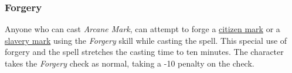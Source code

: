 \subsubsection{Forgery}

Anyone who can cast \emph{Arcane Mark}, can attempt to forge a
\hyperref[sec:Citizen Marks]{citizen mark} or a
\hyperref[sec:Slavery Marks]{slavery mark} using the \emph{Forgery}
skill while casting the spell. This special use of forgery and
the spell stretches the casting time to ten minutes. The character
takes the \emph{Forgery} check as normal, taking a -10 penalty on
the check.

\FloatBarrier
